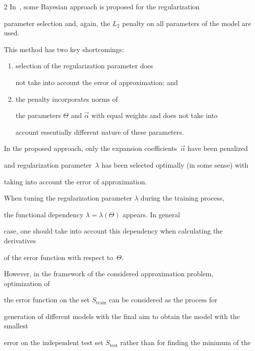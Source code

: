 \begin{multicols}{2}
In~\cite{bayesianLearning}, some Bayesian approach is proposed for the regularization 

parameter selection and, again, the $L_2$ penalty on all parameters of the model are used.

This method has two key shortcomings: 

\begin{enumerate}[(1)]

\item selection of the regularization parameter does 

not take into account the error of approximation; and\\[-9pt]

\item  the penalty incorporates norms of 

the parameters $\Theta$ and $\vec\alpha$ with equal weights and does not take into 

account essentially different nature of these parameters.

\end{enumerate}



In the proposed approach,  only the expansion coefficients~$\vec \alpha$  have been penalized

and regularization parameter~$\lambda$ has been selected optimally (in some sense) with 

taking into account the error of approximation.

{ %



}



When tuning the regularization parameter $\lambda$ during the training process, 

the functional dependency  $\lambda = \lambda \left( \Theta \right)$ appears. In general 

case, one should take into account this dependency when calculating the derivatives 

of the error function with respect to~$\Theta$.

However, in the framework of the considered approximation problem, optimization of 

the error function on the set $S_{\mathrm{train}}$ can be considered as the process for 

generation of different models with the final aim to obtain the model with the smallest 

error on the independent test set $S_{\mathrm{test}}$ rather than for finding the minimum of the 


\end{multicols}
